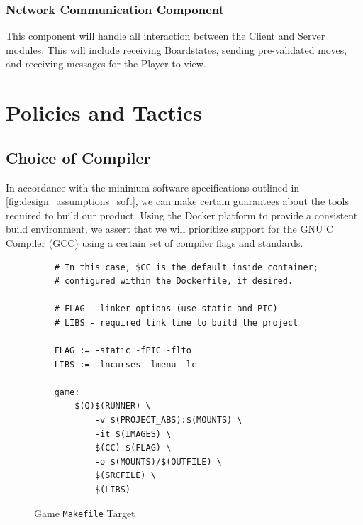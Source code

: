 \documentclass[letterpaper]{article}
\begin{document}
\subsubsection{Network Communication Component}
\label{sec:architecture_system4_Comm}

This component will handle all interaction between the Client
and Server modules. This will include receiving Boardstates,
sending pre-validated moves, and receiving messages for the
Player to view.


\section{Policies and Tactics}
\label{sec:policies}

\subsection{Choice of Compiler}
\label{sec:policies_compiler}

In accordance with the minimum software specifications outlined
in \cref{fig:design_assumptions_soft}, we can make certain
guarantees about the tools required to build our product. Using
the Docker platform to provide a consistent build environment,
we assert that we will prioritize support for the GNU C Compiler
(GCC) using a certain set of compiler flags and standards.

\lstset{basicstyle=\ttfamily}
\lstset{frame=tb}
\begin{figure}
    \begin{lstlisting}
    # In this case, $CC is the default inside container;
    # configured within the Dockerfile, if desired.

    # FLAG - linker options (use static and PIC)
    # LIBS - required link line to build the project

    FLAG := -static -fPIC -flto
    LIBS := -lncurses -lmenu -lc

    game:
        $(Q)$(RUNNER) \
            -v $(PROJECT_ABS):$(MOUNTS) \
            -it $(IMAGES) \
            $(CC) $(FLAG) \
            -o $(MOUNTS)/$(OUTFILE) \
            $(SRCFILE) \
            $(LIBS)
    \end{lstlisting}
    \caption{Game \texttt{Makefile} Target}
    \label{fig:policies_compiler_game_target}
\end{figure}
\end{document}
